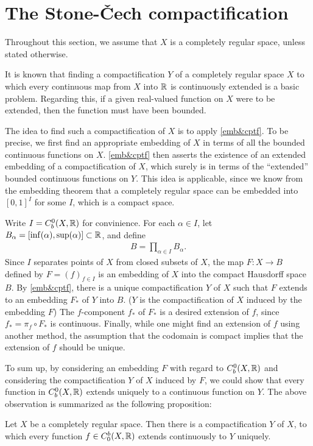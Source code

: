 \section{The Stone-\v{C}ech compactification}

Throughout this section, we assume that $X$ is a completely regular space, unless stated otherwise.

It is known that finding a compactification $Y$ of a completely regular space $X$ to which every continuous map from $X$ into ${\mathbb{R}}$ is continuously extended is a basic problem.
Regarding this, if a given real-valued function on $X$ were to be extended, then the function must have been bounded.

The idea to find such a compactification of $X$ is to apply \cref{emb&cptf}.
To be precise, we first find an appropriate embedding of $X$ in terms of all the bounded continuous functions on $X$.
\cref{emb&cptf} then asserts the existence of an extended embedding of a compactification of $X$, which surely is in terms of the ``extended'' bounded continuous functions on $Y$.
This idea is applicable, since we know from the embedding theorem that a completely regular space can be embedded into $[0, 1]^I$ for some $I$, which is a compact space.

Write $I=C_b^0(X, {\mathbb{R}})$ for convinience.
For each $\alpha\in I$, let $B_\alpha=[\inf(\alpha), \sup(\alpha)]\subset{\mathbb{R}}$, and define
\begin{align*}
    B=\prod_{\alpha\in I}B_\alpha.
\end{align*}
Since $I$ separates points of $X$ from closed subsets of $X$, the map $F: X\rightarrow B$ defined by $F=(f)_{f\in I}$ is an embedding of $X$ into the compact Hausdorff space $B$.
By \cref{emb&cptf}, there is a unique compactification $Y$ of $X$ such that $F$ extends to an embedding $F_*$ of $Y$ into $B$.
($Y$ is the compactification of $X$ induced by the embedding $F$)
The $f$-component $f_*$ of $F_*$ is a desired extension of $f$, since $f_*=\pi_f\circ F_*$ is continuous.
Finally, while one might find an extension of $f$ using another method, the assumption that the codomain is compact implies that the extension of $f$ should be unique.

To sum up, by considering an embedding $F$ with regard to $C_b^0(X, {\mathbb{R}})$ and considering the compactification $Y$ of $X$ induced by $F$, we could show that every function in $C_b^0(X, {\mathbb{R}})$ extends uniquely to a continuous function on $Y$.
The above observation is summarized as the following proposition:
\begin{prop}\label{SC-cptf_ver1}
    Let $X$ be a completely regular space.
    Then there is a compactification $Y$ of $X$, to which every function $f\in C_0^b(X, {\mathbb{R}})$ extends continuously to $Y$ uniquely.
\end{prop}

